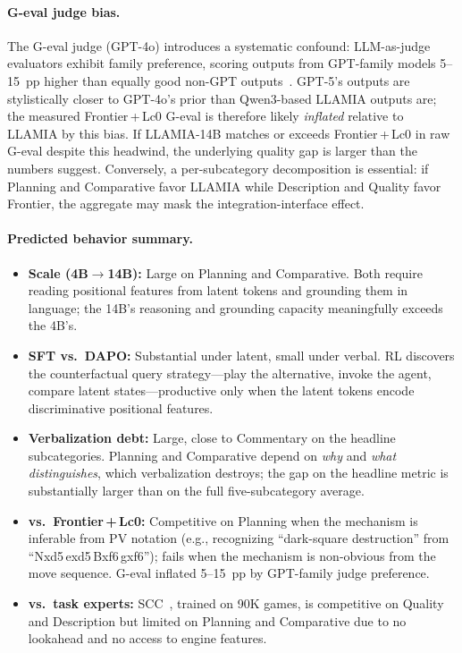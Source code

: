 \paragraph{G-eval judge bias.}
The G-eval judge (GPT-4o) introduces a systematic confound:
LLM-as-judge evaluators exhibit family preference, scoring outputs from
GPT-family models 5--15~pp higher than equally good non-GPT
outputs~\cite{XXX_panickssery2024}.
GPT-5's outputs are stylistically closer to GPT-4o's prior than
Qwen3-based LLAMIA outputs are; the measured Frontier\,+\,Lc0 G-eval is
therefore likely \emph{inflated} relative to LLAMIA by this bias.
If LLAMIA-14B matches or exceeds Frontier\,+\,Lc0 in raw G-eval despite
this headwind, the underlying quality gap is larger than the numbers
suggest.
Conversely, a per-subcategory decomposition is essential: if Planning and
Comparative favor LLAMIA while Description and Quality favor Frontier, the
aggregate may mask the integration-interface effect.

\paragraph{Predicted behavior summary.}
\begin{itemize}[leftmargin=*, itemsep=2pt, topsep=2pt]
\item \textbf{Scale (4B${\to}$14B):} Large on Planning and Comparative.
  Both require reading positional features from latent tokens and
  grounding them in language; the 14B's reasoning and grounding
  capacity meaningfully exceeds the 4B's.
\item \textbf{SFT vs.\ DAPO:} Substantial under latent, small under
  verbal.
  RL discovers the counterfactual query strategy---play the alternative,
  invoke the agent, compare latent states---productive only when the
  latent tokens encode discriminative positional features.
\item \textbf{Verbalization debt:} Large, close to Commentary on the
  headline subcategories.
  Planning and Comparative depend on \emph{why} and
  \emph{what distinguishes}, which verbalization destroys; the gap on
  the headline metric is substantially larger than on the full
  five-subcategory average.
\item \textbf{vs.\ Frontier\,+\,Lc0:} Competitive on Planning when the
  mechanism is inferable from PV notation (e.g., recognizing
  ``dark-square destruction'' from ``Nxd5\,exd5\,Bxf6\,gxf6''); fails
  when the mechanism is non-obvious from the move sequence.
  G-eval inflated 5--15~pp by GPT-family judge preference.
\item \textbf{vs.\ task experts:} SCC~\cite{zang2019automated}, trained
  on 90K games, is competitive on Quality and Description but limited
  on Planning and Comparative due to no lookahead and no access to
  engine features.
\end{itemize}

